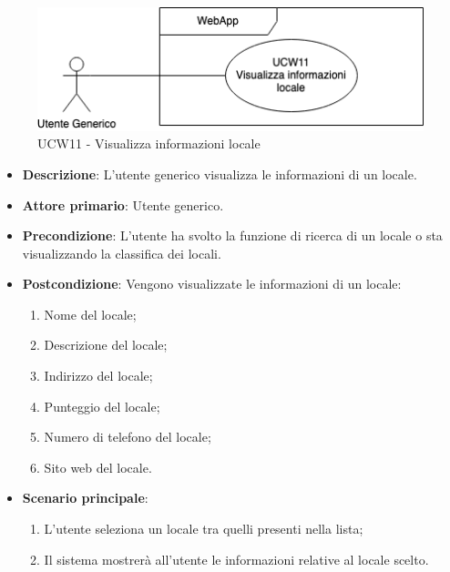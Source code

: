 \begin{figure}[!h]
\centering
\includegraphics[scale=0.5]{UC_images/UCW11.png} 
\caption{UCW11 - Visualizza informazioni locale}
\end{figure}
\begin{itemize}
    \item \textbf{Descrizione}: L'utente generico visualizza le informazioni di un locale.
    \item \textbf{Attore primario}: Utente generico.
    \item \textbf{Precondizione}: L'utente ha svolto la funzione di ricerca di un locale o sta visualizzando la classifica dei locali.
    \item \textbf{Postcondizione}: Vengono visualizzate le informazioni di un locale:
    \begin{enumerate}
        \item Nome del locale;
        \item Descrizione del locale;
        \item Indirizzo del locale;
        \item Punteggio del locale;
        \item Numero di telefono del locale;
        \item Sito web del locale.
        \end{enumerate}
    \item \textbf{Scenario principale}: 
    \begin{enumerate}
    \item L'utente seleziona un locale tra quelli presenti nella lista;
    \item Il sistema mostrerà all'utente le informazioni relative al locale scelto.
    \end{enumerate}
\end{itemize}